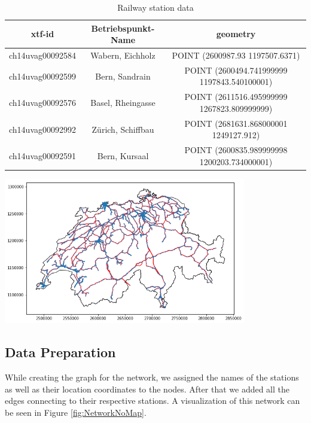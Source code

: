 \documentclass{Resources/netsci-project}
\begin{document}
\begin{table}[H]
\centering
\begin{tabular}{c c c }
\hline 
xtf-id & Betriebspunkt-Name &  geometry\\ 
\hline 
ch14uvag00092584 & Wabern, Eichholz & POINT (2600987.93 1197507.6371) \\
ch14uvag00092599 & Bern, Sandrain & POINT (2600494.741999999 1197843.540100001) \\
ch14uvag00092576 & Basel, Rheingasse & POINT (2611516.495999999 1267823.809999999) \\
ch14uvag00092992 & Zürich, Schiffbau & POINT (2681631.868000001 1249127.912) \\
ch14uvag00092591 & Bern, Kursaal & POINT (2600835.989999998 1200203.734000001) \\
\hline 
\end{tabular}
\caption{Railway station data}
\label{tbl:RailwayStationData}
\end{table}

\begin{center}
    \centering
    \includegraphics[width=300pt]{Resources/Network_on_map}
    \label{fig:NetworkOnMap}
\end{center}

\subsection{Data Preparation}
While creating the graph for the network, we assigned the names of the stations as well as their location coordinates to the nodes. After that we added all the edges connecting to their respective stations. A visualization of this network can be seen in Figure \ref{fig:NetworkNoMap}.
\end{document}
